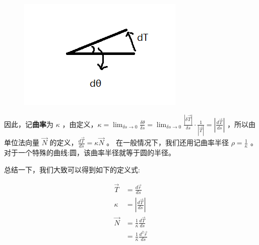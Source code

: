 \documentclass[fontset=windows]{article}
\begin{document}
\begin{figure}[htb]
	\centering
	\includegraphics[scale=1]{2.png}
	\caption{}
\end{figure}

因此，记\textbf{曲率}为 $\kappa$ ，由定义，$\kappa = \lim_{\delta s \rightarrow 0}{\frac{\delta \theta}{\delta s}} = \lim_{\delta s \rightarrow 0}{\frac{|\delta {\vec{T}}|}{\delta s}}\cdot{\frac1{|\vec{T}|}} = |\frac{d\vec T}{ds}|$ ，所以由单位法向量 $\vec{N}$ 的定义，$\frac{d\vec T}{ds} = \kappa \vec{N}$ 。 在一般情况下，我们还用记曲率半径 $\rho = \frac1{\kappa}$ 。对于一个特殊的曲线:圆，该曲率半径就等于圆的半径。

总结一下，我们大致可以得到如下的定义式:

$$
\begin{aligned}
    \vec{T} &= \frac{d\vec{r}}{ds} \\
    \kappa  &= |\frac{d\vec{T}}{ds}| \\
    \vec{N} &= \frac{1}{\kappa} \frac{d\vec{T}}{ds} \\
            &= \frac{1}{\kappa} \frac{d^2{\vec{r}}}{ds}
\end{aligned}
$$




\end{document}
